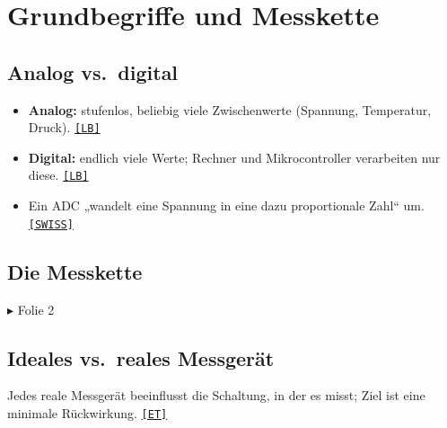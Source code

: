 \documentclass[11pt,a4paper]{article}
\newcommand{\q}[1]{\hyperlink{src:#1}{\textcolor{quelle}{\texttt{\footnotesize[#1]}}}}
\newcommand{\folie}[1]{\textcolor{akzent}{\footnotesize\textsf{$\blacktriangleright$ Folie #1}}}
\begin{document}
\newpage
\section{Grundbegriffe und Messkette}\label{sec:grund}

\subsection{Analog vs.\ digital}
\begin{itemize}
  \item \textbf{Analog:} stufenlos, beliebig viele Zwischenwerte (Spannung, Temperatur, Druck). \q{LB}
  \item \textbf{Digital:} endlich viele Werte; Rechner und Mikrocontroller verarbeiten nur diese. \q{LB}
  \item Ein ADC „wandelt eine Spannung in eine dazu proportionale Zahl“ um. \q{SWISS}
\end{itemize}

\subsection{Die Messkette}\label{sec:messkette}
\folie{2}\\[2mm]
\begin{center}
\end{center}

\subsection{Ideales vs.\ reales Messgerät}
Jedes reale Messgerät beeinflusst die Schaltung, in der es misst; Ziel ist eine minimale Rückwirkung. \q{ET}
\end{document}
